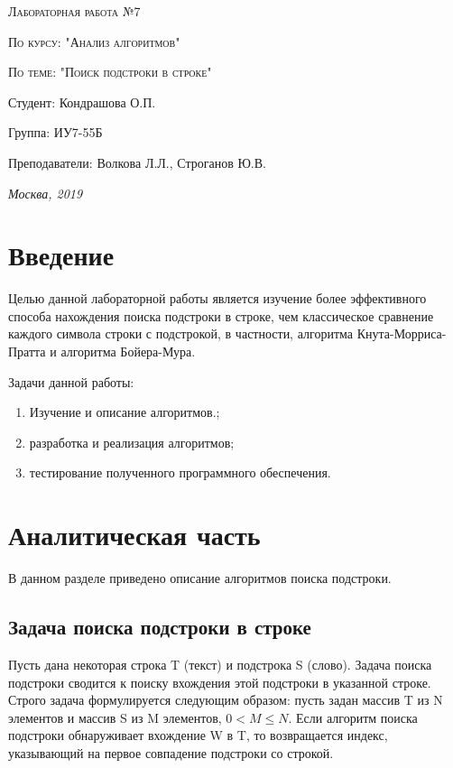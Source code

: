 \documentclass[a4paper, 14pt]{article}
\begin{document}
\begin{titlepage}
	\centering
	{\scshape\Large Лабораторная работа №7\par}
	{\scshape\Large По курсу: "Анализ алгоритмов"\par}
	{\scshape\Large По теме: "Поиск подстроки в строке"\par}
	\vspace{7cm}
	\Large Студент: Кондрашова О.П.\par
	\Large Группа: ИУ7-55Б\par
	\Large Преподаватели:  Волкова Л.Л., Строганов Ю.В.\par

	\vfill
	\large \textit {Москва, 2019} \par
	\end{titlepage}
	
	\setcounter{page}{2}
	\tableofcontents
	
	\newpage
	\section*{Введение}
	
	
		Целью данной лабораторной работы является изучение более эффективного способа нахождения поиска подстроки в строке, чем классическое сравнение каждого символа строки с подстрокой, в частности, алгоритма Кнута-Морриса-Пратта и алгоритма Бойера-Мура. 
		
		Задачи данной работы:
	
	\begin{enumerate}
\item Изучение и описание алгоритмов.;
\item разработка и реализация алгоритмов;
\item тестирование полученного программного обеспечения.
\end{enumerate}

	\newpage
\section{Аналитическая часть}
В данном разделе приведено описание алгоритмов поиска подстроки.

\subsection {Задача поиска подстроки в строке} 

Пусть дана некоторая строка T (текст) и подстрока S (слово). Задача поиска подстроки сводится к поиску вхождения этой подстроки в указанной строке. Строго задача формулируется следующим образом: пусть задан массив T из N элементов и массив S из M элементов, $0<M\leq N$. Если алгоритм поиска подстроки обнаруживает вхождение W в T, то возвращается индекс, указывающий на первое совпадение подстроки со строкой.
\end{document}
